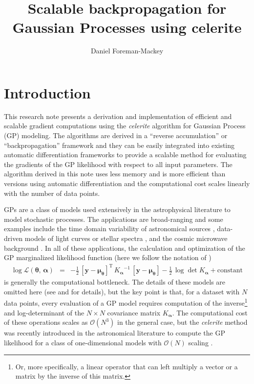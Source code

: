 \documentclass[rnaas]{aastex62}
\newcommand{\eqlabel}[1]{\label{eq:#1}}
\newcommand{\T}{\ensuremath{\mathrm{T}}}
\newcommand{\bvec}[1]{{\ensuremath{\boldsymbol{#1}}}}
\begin{document}
\raggedbottom\sloppy\sloppypar\frenchspacing

\title{%
    Scalable backpropagation for Gaussian Processes using celerite
}

\author[0000-0002-9328-5652]{Daniel Foreman-Mackey}


\section{Introduction}

This research note presents a derivation and implementation of efficient and
scalable gradient computations using the \emph{celerite} algorithm for Gaussian
Process (GP) modeling.
The algorithms are derived in a ``reverse accumulation'' or
``backpropagation'' framework and they can be easily integrated into existing
automatic differentiation frameworks to provide a scalable method for
evaluating the gradients of the GP likelihood with respect to all input
parameters.
The algorithm derived in this note uses less memory and is more efficient than
versions using automatic differentiation and the computational cost scales
linearly with the number of data points.

GPs \citep{Rasmussen:2006} are a class of models used
extensively in the astrophysical literature to model stochastic processes.
The applications are broad-ranging and some examples include the time domain
variability of astronomical sources \citep{Brewer:2009, Kelly:2014,
Haywood:2014, Rajpaul:2015, Foreman-Mackey:2017, Angus:2018}, data-driven
models of light curves or stellar spectra \citep{Wang:2012, Luger:2016,
Czekala:2017}, and the cosmic microwave background
\citep{Bond:1987,Wandelt:2003}.
In all of these applications, the calculation and optimization of the GP
marginalized likelihood function (here we follow the notation of
\citealt{Foreman-Mackey:2017})
\begin{eqnarray}\eqlabel{loglike}
\log \mathcal{L}(\bvec{\theta},\,\bvec{\alpha}) &=&
    -\frac{1}{2}\,\left[\bvec{y} - \bvec{\mu}_\bvec{\theta}\right]^\T\,
        {K_\bvec{\alpha}}^{-1}\,\left[\bvec{y}-\bvec{\mu}_\bvec{\theta}\right]
    -\frac{1}{2}\,\log\det K_\bvec{\alpha} + \mathrm{constant}
\end{eqnarray}
is generally the computational bottleneck.
The details of these models are omitted here (see \citealt{Rasmussen:2006} and
\citealt{Foreman-Mackey:2017} for details), but the key point is that, for a
dataset with $N$ data points, every evaluation of a GP model requires
computation of the inverse\footnote{Or, more specifically, a linear operator
that can left multiply a vector or a matrix by the inverse of this matrix.}
and log-determinant of the $N \times N$ covariance matrix $K_\bvec{\alpha}$.
The computational cost of these operations scales as $\mathcal{O}(N^3)$ in the
general case, but the \emph{celerite} method was recently introduced in the
astronomical literature to compute the GP likelihood for a class of
one-dimensional models with $\mathcal{O}(N)$ scaling
\citep{Ambikasaran:2015, Foreman-Mackey:2017}.
\end{document}

